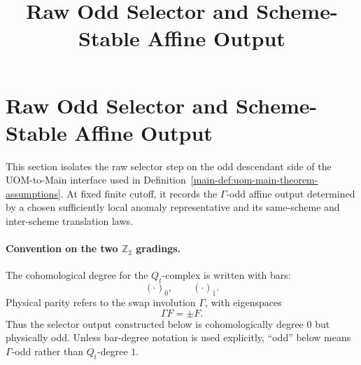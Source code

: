 \documentclass[11pt]{article}
\title{Raw Odd Selector and Scheme-Stable Affine Output}
\author{}
\date{}
\begin{document}
\maketitle
\fi

\section{Raw Odd Selector and Scheme-Stable Affine Output}
\label{sec:odd-selector}

This section isolates the raw selector step on the odd descendant side of the UOM-to-Main
interface used in Definition~\ref{main-def:uom-main-theorem-assumptions}.
At fixed finite cutoff, it records the \(\Gamma\)-odd affine output determined by a chosen
sufficiently local anomaly representative and its same-scheme and inter-scheme translation laws.

\paragraph{Convention on the two \texorpdfstring{\(\mathbb Z_2\)}{Z2} gradings.}
The cohomological degree for the \(Q_t\)-complex is written with bars:
\[
(\cdot)_{\bar 0},
\qquad
(\cdot)_{\bar 1}.
\]
Physical parity refers to the swap involution \(\Gamma\), with eigenspaces
\[
\Gamma F=\pm F.
\]
Thus the selector output constructed below is cohomologically degree \(0\) but physically odd.
Unless bar-degree notation is used explicitly, ``odd'' below means \(\Gamma\)-odd rather than
\(Q_t\)-degree \(1\).
\end{document}
